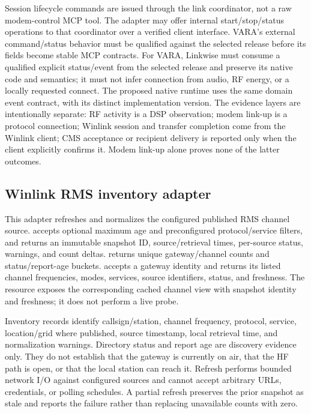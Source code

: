 \documentclass[11pt,a4paper]{article}
\begin{document}
Session lifecycle commands are issued through the link coordinator, not a
raw modem-control MCP tool. The adapter may offer internal start/stop/status
operations to that coordinator over a verified client interface. VARA's
external command/status behavior must be qualified against the selected
release before its fields become stable MCP contracts. For VARA, Linkwise
must consume a qualified explicit status/event from the selected release and
preserve its native code and semantics; it must not infer connection from
audio, RF energy, or a locally requested connect. The proposed native runtime
uses the same domain event contract, with its distinct implementation version.
The evidence layers are intentionally separate: RF activity is a DSP
observation; modem link-up is a protocol connection; Winlink session and
transfer completion come from the Winlink client; CMS acceptance or recipient
delivery is reported only when the client explicitly confirms it. Modem
link-up alone proves none of the latter outcomes.

\subsection{Winlink RMS inventory adapter}
This adapter refreshes and normalizes the configured published RMS channel
source.  accepts optional maximum age and
preconfigured protocol/service filters, and returns an immutable snapshot
ID, source/retrieval times, per-source status, warnings, and count deltas.
 returns unique gateway/channel counts
and status/report-age buckets.  accepts
a gateway identity and returns its listed channel frequencies, modes,
services, source identifiers, status, and freshness. The
 resource exposes the corresponding cached
channel view with snapshot identity and freshness; it does not perform a live
probe.

Inventory records identify callsign/station, channel frequency, protocol,
service, location/grid where published, source timestamp, local retrieval
time, and normalization warnings. Directory status and report age are
discovery evidence only. They do not establish that the gateway is currently
on air, that the HF path is open, or that the local station can reach it.
Refresh performs bounded network I/O against configured sources and cannot
accept arbitrary URLs, credentials, or polling schedules. A partial refresh
preserves the prior snapshot as stale and reports the failure rather than
replacing unavailable counts with zero.
\end{document}
